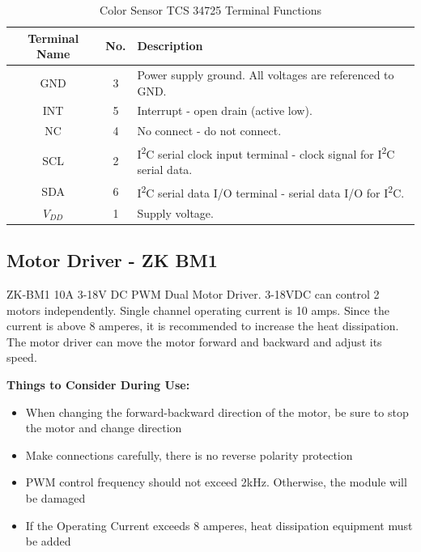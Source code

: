 \documentclass[english,project]{buwthesis}
\begin{document}
\begin{table}[ht]
\centering
\begin{tabular}{|c|c|l|}
\hline
\textbf{Terminal Name} & \textbf{No.} & \textbf{Description} \\ \hline
GND                   & 3            & Power supply ground. All voltages are referenced to GND. \\ \hline
INT                   & 5            & Interrupt - open drain (active low). \\ \hline
NC                    & 4            & No connect - do not connect. \\ \hline
SCL                   & 2            & I\textsuperscript{2}C serial clock input terminal - clock signal for I\textsuperscript{2}C serial data. \\ \hline
SDA                   & 6            & I\textsuperscript{2}C serial data I/O terminal - serial data I/O for I\textsuperscript{2}C. \\ \hline
$V_{DD}$              & 1            & Supply voltage. \\ \hline
\end{tabular}
\caption{Color Sensor TCS 34725 Terminal Functions\cite{tcs34725datasheet}}
\label{tab:colorsensorterminalfunction}
\end{table}


\subsection{Motor Driver - ZK BM1}

ZK-BM1 10A 3-18V DC PWM Dual Motor Driver. 3-18VDC can control 2 motors independently. Single channel operating current is 10 amps. Since the current is above 8 amperes, it is recommended to increase the heat dissipation. The motor driver can move the motor forward and backward and adjust its speed. \cite{motorobitZKBM1}

\textbf{Things to Consider During Use:}
\begin{itemize}
    \item When changing the forward-backward direction of the motor, be sure to stop the motor and change direction
    \item Make connections carefully, there is no reverse polarity protection
    \item PWM control frequency should not exceed 2kHz. Otherwise, the module will be damaged
    \item If the Operating Current exceeds 8 amperes, heat dissipation equipment must be added
\end{itemize}
\end{document}
